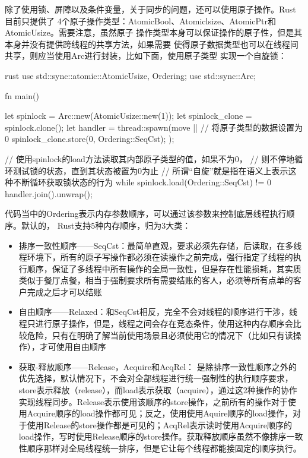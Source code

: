 除了使用锁、屏障以及条件变量，关于同步的问题，还可以使用原子操作。Rust目前只提供了
4个原子操作类型：AtomicBool、Atomiclsize、AtomicPtr和AtomicUsize。需要注意，虽然原子
操作类型本身可以保证操作的原子性，但是其本身并没有提供跨线程的共享方法，如果需要
使得原子数据类型也可以在线程间共享，则应当使用Arc进行封装，比如下面，使用原子类型
实现一个自旋锁：
\begin{code-block}{rust}
use std::sync::atomic::{AtomicUsize, Ordering};
use std::sync::Arc;

fn main() {
    let spinlock = Arc::new(AtomicUsize::new(1));
    let spinlock_clone = spinlock.clone();
    let handler = thread::spawn(move || {
        // 将原子类型的数据设置为0
        spinlock_clone.store(0, Ordering::SeqCst);
    });

    // 使用spinlock的load方法读取其内部原子类型的值，如果不为0，
    // 则不停地循环测试锁的状态，直到其状态被置为0为止
    // 所谓“自旋”就是指在语义上表示这种不断循环获取锁状态的行为
    while spinlock.load(Ordering::SeqCst) != 0 {}
    handler.join().unwrap();
}
\end{code-block}
代码当中的Ordering表示内存参数顺序，可以通过该参数来控制底层线程执行顺序。默认的，
Rust支持5种内存顺序，归为3大类：
\begin{itemize}
  \item 排序一致性顺序——SeqCst：最简单直观，要求必须先存储，后读取，在多线程环境下，所有的原子写操作都必须在读操作之前完成，强行指定了线程的执行顺序，保证了多线程中所有操作的全局一致性，但是存在性能损耗，其实质类似于餐厅点餐，相当于强制要求所有需要结账的客人，必须等所有点单的客户完成之后才可以结账
  \item 自由顺序——Relaxed：和SeqCst相反，完全不会对线程的顺序进行干涉，线程只进行原子操作，但是，线程之间会存在竞态条件，使用这种内存顺序会比较危险，只有在明确了解当前使用场景且必须使用它的情况下（比如只有读操作），才可使用自由顺序
  \item 获取-释放顺序——Release，Acquire和AcqRel： 是除排序一致性顺序之外的优先选择，默认情况下，不会对全部线程进行统一强制性的执行顺序要求，store表示释放（release），而load表示获取（acquire），通过这2种操作的协作实现线程同步。Release表示使用该顺序的store操作，之前所有的操作对于使用Acquire顺序的load操作都可见；反之，使用使用Aquire顺序的load操作，对于使用Release的store操作都是可见的；AcqRel表示读时使用Acquire顺序的load操作，写时使用Release顺序的store操作。获取释放顺序虽然不像排序一致性顺序那样对全局线程统一排序，但是它让每个线程都能接固定的顺序执行。
\end{itemize}


